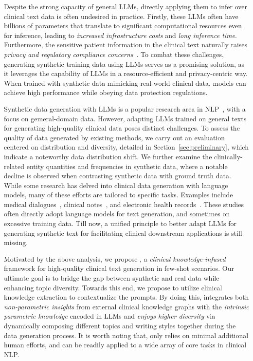 Despite the strong capacity of general LLMs, 
directly applying them to infer over clinical text data is often undesired in practice. 
Firstly, these LLMs often have billions of parameters that translate to significant computational resources even for inference, leading to \emph{increased infrastructure costs} and \emph{long inference time}. 
Furthermore, the sensitive patient information in the clinical text naturally raises \emph{privacy and regulatory compliance concerns}~\citep{mesko2023imperative}. 
To combat these challenges, generating synthetic training data using LLMs serves as a promising solution, as it leverages the capability of LLMs in a resource-efficient and privacy-centric way. When trained with synthetic data mimicking real-world clinical data, models can achieve high performance while obeying data protection regulations. %

Synthetic data generation with LLMs is a popular research area in NLP~\citep{meng2022generating,ye2022zerogen,ye2022progen,wang2023lets}, with a focus on gemeral-domain data. 
However, adapting LLMs trained on general texts for generating high-quality clinical data poses distinct challenges. 
To assess the quality of data generated by existing methods, we carry out an  evaluation centered on distribution and diversity, detailed in Section~\ref{sec:preliminary}, which
indicate a noteworthy data distribution shift. We further examine the clinically-related entity quantities and frequencies in synthetic data, where a notable decline is observed when contrasting synthetic data with ground truth data.  
While some research has delved into clinical data generation with language models, many of these efforts are tailored to specific tasks. 
Examples include medical dialogues~\citep{chintagunta2021medically}, clinical notes~\citep{giorgi2023clinical}, 
and electronic health records~\citep{ive2020generation}. 
These studies often directly adopt language models for text generation, and sometimes on excessive training data.
Till now, a unified principle to better adapt LLMs for generating synthetic text for facilitating clinical downstream applications is still missing.

Motivated by the above analysis, we propose \ours, a \emph{clinical knowledge-infused}  framework for high-quality clinical text generation in few-shot scenarios. 
Our ultimate goal is to bridge the gap between synthetic and real data while enhancing topic diversity. 
Towards this end, we propose to utilize clinical knowledge extraction to contextualize the prompts. 
By doing this, {\ours} integrates both \emph{non-parametric insights} from external clinical knowledge graphs with the \emph{intrinsic parametric knowledge} encoded in LLMs and \emph{enjoys higher diversity} via dynamically composing different topics and writing styles together during the data generation process.
It is worth noting that, \ours only relies on minimal additional human efforts, and can be readily applied to a wide array of core tasks in clinical NLP.

